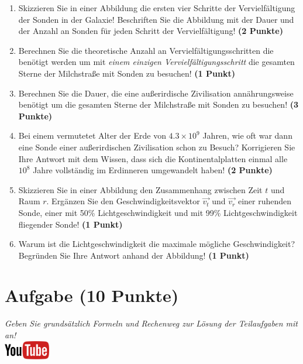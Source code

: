 \documentclass[a4paper, 9pt]{scrartcl}\usepackage[]{graphicx}\usepackage[]{xcolor}
\begin{document}
\begin{enumerate}
\item Skizzieren Sie in einer Abbildung die ersten vier Schritte der
  Vervielf{\"a}ltigung der Sonden in der Galaxie! Beschriften Sie die Abbildung
  mit der Dauer und der Anzahl an Sonden f{\"u}r jeden Schritt der Vervielf{\"a}ltigung! \textbf{(2 Punkte)}
\item Berechnen Sie die theoretische Anzahl an Vervielf{\"a}ltigungsschritten die
  ben{\"o}tigt werden um mit \textit{einem einzigen Vervielf{\"a}ltigungsschritt} die
  gesamten Sterne der Milchstra{\ss}e mit Sonden zu besuchen! \textbf{(1 Punkt)}
\item Berechnen Sie die Dauer, die eine au{\ss}erirdische Zivilisation
  ann{\"a}hrungsweise ben{\"o}tigt um die gesamten Sterne der Milchstra{\ss}e mit
  Sonden zu besuchen! \textbf{(3 Punkte)}
\item Bei einem vermutetet Alter der Erde von $\ensuremath{4.3\times 10^{9}}$ Jahren,
  wie oft war dann eine Sonde einer au{\ss}erirdischen Zivilisation schon zu
  Besuch? Korrigieren Sie Ihre Antwort mit dem Wissen, dass sich die
  Kontinentalplatten einmal alle $\ensuremath{10^{8}}$ Jahre vollst{\"a}ndig im
  Erdinneren umgewandelt haben! \textbf{(2 Punkte)}
\item Skizzieren Sie in einer Abbildung den Zusammenhang zwischen Zeit $t$
  und Raum $r$. Erg{\"a}nzen Sie den Geschwindigkeitsvektor $\vec{v_t}$ und
  $\vec{v_r}$ einer ruhenden Sonde, einer mit 50\% Lichtgeschwindigkeit und
  mit 99\% Lichtgeschwindigkeit fliegender Sonde! \textbf{(1 Punkt)}
\item Warum ist die Lichtgeschwindigkeit die maximale m{\"o}gliche Geschwindigkeit?
Begr{\"u}nden Sie Ihre Antwort anhand der Abbildung!  \textbf{(1 Punkt)}
\end{enumerate}


 
\clearpage

\section{Aufgabe \hfill (10 Punkte)}

\textit{Geben Sie grunds{\"a}tzlich Formeln und Rechenweg zur L{\"o}sung der
  Teilaufgaben mit an!} \\[1Ex]

\hfill\href{https://youtu.be/aBxLkdF-c4M}{\includegraphics[width =
  2cm]{img/youtube}} %
\hspace{2Ex}
\end{document}
